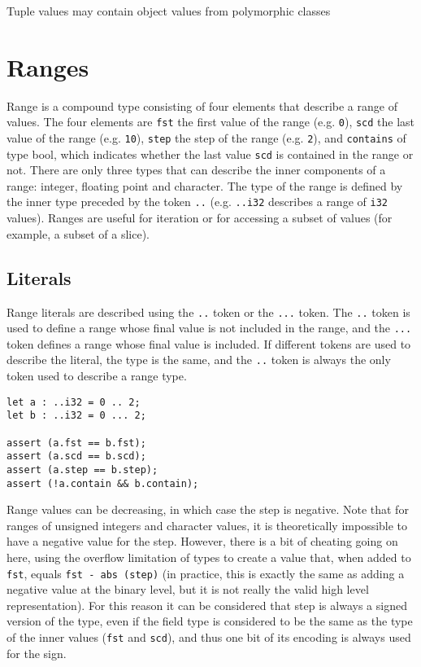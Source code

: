 Tuple values may contain object values from polymorphic classes

\section {Ranges}%
\label{sec:range_type}

Range is a compound type consisting of four elements that describe a range of
values. The four elements are \texttt{fst} the first value of the range (e.g.
\texttt{0}), \texttt{scd} the last value of the range (e.g. \texttt{10}),
\texttt{step} the step of the range (e.g. \texttt{2}), and \texttt{contains} of
type bool, which indicates whether the last value \texttt{scd} is contained in
the range or not. There are only three types that can describe the inner
components of a range: integer, floating point and character. The type of the
range is defined by the inner type preceded by the token \texttt{..} (e.g.
\texttt{..i32} describes a range of \texttt{i32} values). Ranges are useful for
iteration or for accessing a subset of values (for example, a subset of a
slice).

\subsection {Literals}

Range literals are described using the \texttt{..} token or the \texttt{...}
token. The \texttt{..} token is used to define a range whose final value is not
included in the range, and the \texttt{...} token defines a range whose final
value is included. If different tokens are used to describe the literal, the
type is the same, and the \texttt{..} token is always the only token used to
describe a range type.

\begin{lstlisting}[style=coloredverbatim]
let a : ..i32 = 0 .. 2;
let b : ..i32 = 0 ... 2;

assert (a.fst == b.fst);
assert (a.scd == b.scd);
assert (a.step == b.step);
assert (!a.contain && b.contain);
\end{lstlisting}

Range values can be decreasing, in which case the step is negative. Note that
for ranges of unsigned integers and character values, it is theoretically
impossible to have a negative value for the step. However, there is a bit of
cheating going on here, using the overflow limitation of types to create a value
that, when added to \texttt{fst}, equals \texttt{fst - abs (step)} (in practice,
this is exactly the same as adding a negative value at the binary level, but it
is not really the valid high level representation). For this reason it can be
considered that step is always a signed version of the type, even if the field
type is considered to be the same as the type of the inner values (\texttt{fst}
and \texttt{scd}), and thus one bit of its encoding is always used for the sign.
\smallskip

